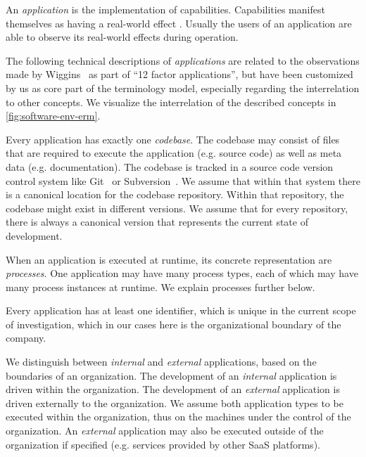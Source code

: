 An \emph{application} is the implementation of capabilities. Capabilities manifest themselves as having a real-world effect \cite{modServicesAnalysis}. Usually the users of an application are able to observe its real-world effects during operation.

The following technical descriptions of \emph{applications} are related to the observations made by Wiggins~\cite{12factor} as part of ``12 factor applications'', but have been customized by us as core part of the terminology model, especially regarding the interrelation to other concepts. We visualize the interrelation of the described concepts in \autoref{fig:software-env-erm}.

Every application has exactly one \emph{codebase}. The codebase may consist of files that are required to execute the application (e.g. source code) as well as meta data (e.g. documentation). The codebase is tracked in a source code version control system like Git~\cite{ProGit} or Subversion~\cite{svn}. We assume that within that system there is a canonical location for the codebase repository. Within that repository, the codebase might exist in different versions. We assume that for every repository, there is always a canonical version that represents the current state of development.

When an application is executed at runtime, its concrete representation are \emph{processes}. One application may have many process types, each of which may have many process instances at runtime. We explain processes further below.

Every application has at least one identifier, which is unique in the current scope of investigation, which in our cases here is the organizational boundary of the company.

We distinguish between \emph{internal} and \emph{external} applications, based on the boundaries of an organization. The development of an \emph{internal} application is driven within the organization. The development of an \emph{external} application is driven externally to the organization. We assume both application types to be executed within the organization, thus on the machines under the control of the organization. An \emph{external} application may also be executed outside of the organization if specified (e.g. services provided by other SaaS platforms).


